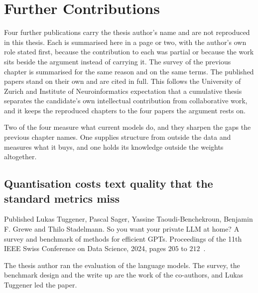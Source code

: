 \chapter{Further Contributions}
\label{chap:further}
\margintoc

Four further publications carry the thesis author's name and are not
reproduced in this thesis. Each is summarised here in a page or two, with the
author's own role stated first, because the contribution to each was partial
or because the work sits beside the argument instead of carrying it. The survey
of the previous chapter is summarised for the same reason and on the same
terms. The published papers stand on their own and are cited in full. This
follows the University of Zurich and Institute of Neuroinformatics expectation
that a cumulative thesis separates the candidate's own intellectual
contribution from collaborative work, and it keeps the reproduced chapters to
the four papers the argument rests on.

Two of the four measure what current models do, and they sharpen the gaps the
previous chapter names. One supplies structure from outside the data and measures
what it buys, and one holds its knowledge outside the weights altogether.

\section{Quantisation costs text quality that the standard metrics miss}
\label{sec:llmbench}

\begin{publicationbasis}{Published}
Lukas Tuggener, Pascal Sager, Yassine Taoudi-Benchekroun, Benjamin F. Grewe
and Thilo Stadelmann. So you want your private LLM at home? A survey and
benchmark of methods for efficient GPTs. Proceedings of the 11th IEEE Swiss
Conference on Data Science, 2024, pages $205$ to
$212$~\cite{tuggener_you_2024}.
\end{publicationbasis}

The thesis author ran the evaluation of the language models. The survey, the
benchmark design and the write up are the work of the co-authors, and Lukas
Tuggener led the paper.

